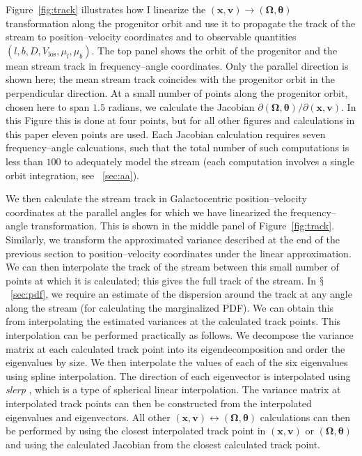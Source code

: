 \documentclass[12pt,preprint]{aastex}
\renewcommand{\figurename}{Figure}
\newcommand{\sectionname}{$\mathsection$}
\renewcommand{\vec}[1]{\ensuremath{\mathbf{#1}}}
\newcommand{\vecx}{\ensuremath{\vec{x}}}
\newcommand{\vecv}{\ensuremath{\vec{v}}}
\newcommand{\veco}{\ensuremath{\vec{\Omega}}}
\newcommand{\veca}{\ensuremath{\boldsymbol\theta}}
\newcommand{\vlos}{\ensuremath{V_{\mathrm{los}}}}
\newcommand{\pmll}{\ensuremath{\mu_l}}
\newcommand{\pmbb}{\ensuremath{\mu_b}}
\begin{document}
\figurename~\ref{fig:track} illustrates how I linearize the
$(\vecx,\vecv) \rightarrow (\veco,\veca)$ transformation along the
progenitor orbit and use it to propagate the track of the stream to
position--velocity coordinates and to observable quantities
$(l,b,D,\vlos,\pmll,\pmbb)$. The top panel shows the orbit of the
progenitor and the mean stream track in frequency--angle
coordinates. Only the parallel direction is shown here; the mean
stream track coincides with the progenitor orbit in the perpendicular
direction. At a small number of points along the progenitor orbit,
chosen here to span $1.5$ radians, we calculate the Jacobian $\partial
(\veco,\veca) / \partial (\vecx,\vecv)$. In this Figure this is done
at four points, but for all other figures and calculations in this
paper eleven points are used. Each Jacobian calculation requires seven
frequency--angle calcuations, such that the total number of such
computations is less than $100$ to adequately model the stream (each
computation involves a single orbit integration, see
\appendixname~\ref{sec:aa}). 

We then calculate the stream track in Galactocentric
position--velocity coordinates at the parallel angles for which we
have linearized the frequency--angle transformation. This is shown in
the middle panel of \figurename~\ref{fig:track}. Similarly, we
transform the approximated variance described at the end of the
previous section to position--velocity coordinates under the linear
approximation. We can then interpolate the track of the stream between
this small number of points at which it is calculated; this gives the
full track of the stream. In \sectionname~\ref{sec:pdf}, we require an
estimate of the dispersion around the track at any angle along the
stream (for calculating the marginalized PDF). We can obtain this from
interpolating the estimated variances at the calculated track
points. This interpolation can be performed practically as follows. We
decompose the variance matrix at each calculated track point into its
eigendecomposition and order the eigenvalues by size. We then
interpolate the values of each of the six eigenvalues using spline
interpolation. The direction of each eigenvector is interpolated using
\emph{slerp} \citep{Shoemake85a}, which is a type of spherical linear
interpolation. The variance matrix at interpolated track points can
then be constructed from the interpolated eigenvalues and
eigenvectors. All other $(\vecx,\vecv) \leftrightarrow (\veco,\veca)$
calculations can then be performed by using the closest interpolated
track point in $(\vecx,\vecv)$ or $(\veco,\veca)$ and using the
calculated Jacobian from the closest calculated track point.
\end{document}

